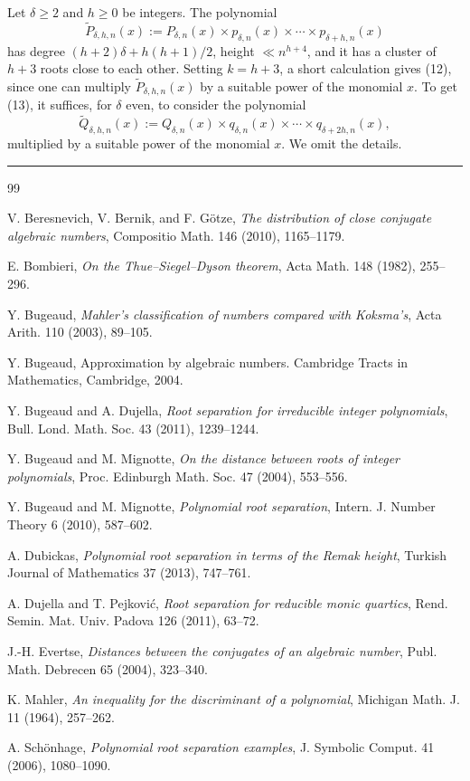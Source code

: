 \documentclass [11pt] {article}
\newcommand {\qed} {\null \hfill \rule{2mm}{2mm}}
\begin{document}
Let $\delta \ge 2$ and $h \ge 0$ be integers. The polynomial
$$
{\tilde P}_{\delta, h, n} (x) :=
P_{\delta, n} (x) \times p_{\delta,n} (x) \times \cdots \times p_{\delta+h, n} (x)
$$
has degree $(h+2)\delta + h(h+1)/2$, height $\ll  n^{h+4}$, and
it has a cluster of $h+3$ roots close
to each other. Setting $k = h+3$, a short calculation gives (12), since one can
multiply ${\tilde P}_{\delta, h, n} (x)$ by a suitable power of the monomial $x$.
To get (13), it suffices, for $\delta$ even, to consider the polynomial
$$
{\tilde Q}_{\delta, h, n} (x) :=
Q_{\delta, n} (x) \times q_{\delta,n} (x) \times \cdots \times q_{\delta + 2 h, n} (x),
$$
multiplied by a suitable power of the monomial $x$.
We omit the details.
\qed



\bigskip

\begin{thebibliography}{99}


V. Beresnevich, V. Bernik, and F. G\"otze,
{\it The distribution of close conjugate algebraic numbers},
Compositio Math. 146  (2010), 1165--1179.


E. Bombieri,
{\it On the Thue--Siegel--Dyson theorem},
Acta Math. 148 (1982), 255--296.

Y. Bugeaud,
{\it Mahler's classification of numbers compared with Koksma's},
Acta Arith. 110 (2003), 89--105.



Y. Bugeaud,
Approximation by algebraic numbers.
Cambridge Tracts in Mathematics, Cambridge, 2004.

Y. Bugeaud and A. Dujella,
{\it Root separation for irreducible integer polynomials},
Bull. Lond. Math. Soc. 43 (2011), 1239--1244.

Y. Bugeaud and M. Mignotte,
{\it On the distance between roots of integer polynomials},
Proc. Edinburgh Math. Soc. 47 (2004), 553--556.


Y. Bugeaud and M. Mignotte,
{\it Polynomial root separation},
Intern. J. Number Theory 6 (2010), 587--602.

A. Dubickas,
{\it Polynomial root separation in terms of the Remak height},
Turkish Journal of Mathematics 37 (2013), 747--761.

A. Dujella and T. Pejkovi\'c,
{\it Root separation for reducible monic quartics},
Rend. Semin. Mat. Univ. Padova 126 (2011), 63--72.

J.-H. Evertse,
{\it Distances between the conjugates of an algebraic number},
Publ. Math. Debrecen 65 (2004), 323--340.


K. Mahler,
{\it An inequality for the discriminant of a polynomial},
Michigan Math. J. 11 (1964), 257--262.

A. Sch\"onhage,
{\it Polynomial root separation examples},
J. Symbolic Comput.  41  (2006),  1080--1090.



\end{thebibliography}
\end{document}
